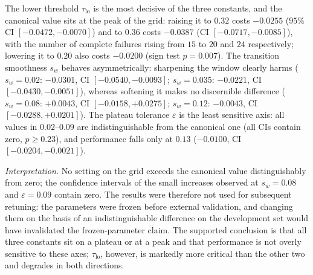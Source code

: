 \documentclass[11pt,a4paper]{article}
\begin{document}
The lower threshold $\tau_{\text{lo}}$ is the most decisive of the three constants,
and the canonical value sits at the peak of the grid: raising it to $0.32$ costs
$-0.0255$ ($95\%$ CI $[-0.0472,-0.0070]$) and to $0.36$ costs $-0.0387$ (CI
$[-0.0717,-0.0085]$), with the number of complete failures rising from $15$ to $20$
and $24$ respectively; lowering it to $0.20$ also costs $-0.0200$ (sign test
$p=0.007$). The transition smoothness $s_w$ behaves asymmetrically: sharpening the
window clearly harms ($s_w{=}0.02$: $-0.0301$, CI $[-0.0540,-0.0093]$;
$s_w{=}0.035$: $-0.0221$, CI $[-0.0430,-0.0051]$), whereas softening it makes no
discernible difference ($s_w{=}0.08$: $+0.0043$, CI $[-0.0158,+0.0275]$;
$s_w{=}0.12$: $-0.0043$, CI $[-0.0288,+0.0201]$). The plateau tolerance
$\varepsilon$ is the least sensitive axis: all values in $0.02$--$0.09$ are
indistinguishable from the canonical one (all CIs contain zero, $p\ge0.23$), and
performance falls only at $0.13$ ($-0.0100$, CI $[-0.0204,-0.0021]$).

\emph{Interpretation.} No setting on the grid exceeds the canonical value
distinguishably from zero; the confidence intervals of the small increases observed
at $s_w{=}0.08$ and $\varepsilon{=}0.09$ contain zero. The results were therefore
not used for subsequent retuning: the parameters were frozen before external
validation, and changing them on the basis of an indistinguishable difference on
the development set would have invalidated the frozen-parameter claim. The
supported conclusion is that all three constants sit on a plateau or at a peak and
that performance is not overly sensitive to these axes; $\tau_{\text{lo}}$,
however, is markedly more critical than the other two and degrades in both
directions.
\end{document}
